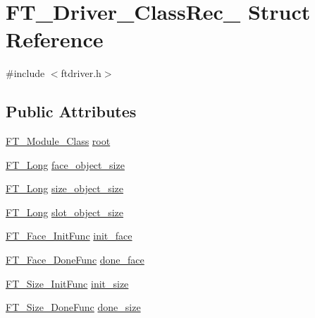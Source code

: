 \hypertarget{struct_f_t___driver___class_rec__}{\section{F\-T\-\_\-\-Driver\-\_\-\-Class\-Rec\-\_\- Struct Reference}
\label{struct_f_t___driver___class_rec__}
}


{\ttfamily \#include $<$ftdriver.\-h$>$}

\subsection*{Public Attributes}
\begin{DoxyCompactItemize}
\item 
\hyperlink{ftmodapi_8h_a1bdc5c23cae8b7c61c05966edc4e8343}{F\-T\-\_\-\-Module\-\_\-\-Class} \hyperlink{struct_f_t___driver___class_rec___a087ca3e2c562bb90b8af82b31e82d8c7}{root}
\item 
\hyperlink{fttypes_8h_a7fa72a1f0e79fb1860c5965789024d6f}{F\-T\-\_\-\-Long} \hyperlink{struct_f_t___driver___class_rec___a194fc6fbae019e9c109c65328e57e44f}{face\-\_\-object\-\_\-size}
\item 
\hyperlink{fttypes_8h_a7fa72a1f0e79fb1860c5965789024d6f}{F\-T\-\_\-\-Long} \hyperlink{struct_f_t___driver___class_rec___a436687825ee47ed94da71fda90e2f578}{size\-\_\-object\-\_\-size}
\item 
\hyperlink{fttypes_8h_a7fa72a1f0e79fb1860c5965789024d6f}{F\-T\-\_\-\-Long} \hyperlink{struct_f_t___driver___class_rec___adcce7eb86dd7c763b622818cfcde99a6}{slot\-\_\-object\-\_\-size}
\item 
\hyperlink{ftdriver_8h_a702229b1ccc371a3f06b8f0fce3ed012}{F\-T\-\_\-\-Face\-\_\-\-Init\-Func} \hyperlink{struct_f_t___driver___class_rec___a68e94aeae3e78ed5984c29189c64df9a}{init\-\_\-face}
\item 
\hyperlink{ftdriver_8h_ad0b0c47fbd51cf9ece953ad7c128fb56}{F\-T\-\_\-\-Face\-\_\-\-Done\-Func} \hyperlink{struct_f_t___driver___class_rec___a7d37afe63f914ae28ed02c960e4d5642}{done\-\_\-face}
\item 
\hyperlink{ftdriver_8h_a03cb45682a7dcf4cb1853eacde8b4b75}{F\-T\-\_\-\-Size\-\_\-\-Init\-Func} \hyperlink{struct_f_t___driver___class_rec___a0aec58307bc166f0e74c890509638ddf}{init\-\_\-size}
\item 
\hyperlink{ftdriver_8h_a89d0743c19dbf86b2acc3fede1c01924}{F\-T\-\_\-\-Size\-\_\-\-Done\-Func} \hyperlink{struct_f_t___driver___class_rec___a5c96f627816a089b27bcff09f22dd1a6}{done\-\_\-size}

\end{DoxyCompactItemize}
